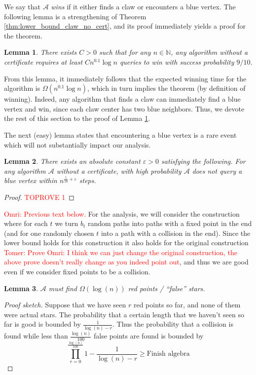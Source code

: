 \documentclass[11pt]{article}
\numberwithin{equation}{section}
\newtheorem{lemma}[lemma]{Lemma}
\newcommand{\N}{\mathbb N}
\newcommand{\eps}{\varepsilon}
\newcommand{\1}{\mathbf{1}}
\newcommand{\A}{\mathcal A}
\newcommand{\beq}{\begin{equation}}
\newcommand{\eeq}{\end{equation}}
\newcommand\omri[1]{{\textcolor{red}{Omri: #1}}}
\newcommand\tomer[1]{{\textcolor{red}{Tomer: #1}}}
\begin{document}
We say that $\A$ \emph{wins} if it either finds a claw or encounters a blue vertex. The following lemma is a strengthening of Theorem \ref{thm:lower_bound_claw_no_cert}, and its proof immediately yields a proof for the theorem. 
\begin{lemma}
\label{lem:winning}
There exists $C > 0$ such that for any $n \in \N$, any algorithm without a certificate requires at least $C n^{0.1} \log n$ queries to win with success probability $9/10$.
\end{lemma}
From this lemma, it immediately follows that the expected winning time for the algorithm is $\Omega(n^{0.1} \log n)$, which in turn implies the theorem (by definition of winning). Indeed, any algorithm that finds a claw can immediately find a blue vertex and win, since each claw center has two blue neighbors.
Thus, we devote the rest of this section to the proof of Lemma \ref{lem:winning}.

The next (easy) lemma states that encountering a blue vertex is a rare event which will not substantially impact our analysis.
\begin{lemma}
\label{lem:no_blue_vertices}
There exists an absolute constant $\eps > 0$ satisfying the following. For any algorithm $\A$ without a certificate, with high probability $\A$ does not query a blue vertex within $n^{\frac{1}{10} + \eps}$ steps.
\end{lemma}
\begin{proof}\textcolor{red}{TOPROVE 1}\end{proof}


\iffalse
\vspace{1cm}
\omri{Previous text below.}
For the analysis, we will consider the construction where for each $t$ we turn $b_t$ random paths into paths with a fixed point in the end (and for one randomly chosen $t$ into a path with a collision in the end). Since the lower bound holds for this construction it also holds for the original construction \tomer{Prove} \omri{I think we can just change the original construction, the above prove doesn't really change as you indeed point out}, and thus we are good even if we consider fixed points to be a collision.


\begin{lemma}
$\A$ must find $\Omega(\log(n))$ red points / ``false'' stars.
\end{lemma}
\begin{proof}[Proof sketch]
Suppose that we have seen $r$ red points so far, and none of them were actual stars. The probability that a certain length that we haven't seen so far is good is bounded by $\frac{1}{\log(n) - r}$. Thus the probability that a collision is found while less than $\frac{\log(n)}{100}$ false points are found is  bounded by \beq \prod_{r=0}^{\frac{\log(n)}{100}}  1 - \frac{1}{\log(n) - r} \ge \text{Finish algebra}\eeq


\end{proof}
\end{document}
